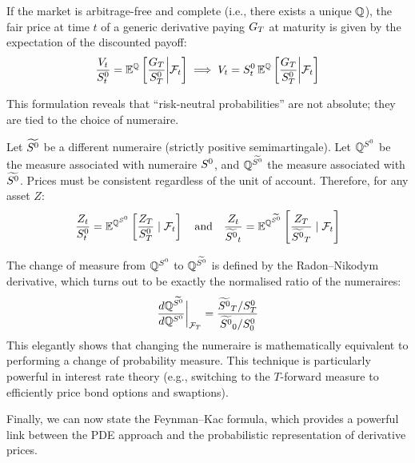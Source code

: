If the market is arbitrage-free and complete (i.e., there exists a unique $\mathbb{Q}$), the fair price at time $t$ of a generic derivative paying $G_T$ at maturity is given by the expectation of the discounted payoff:
\begin{equation}
    \frac{V_t}{S^0_t} = \mathbb{E}^{\mathbb{Q}} \left[ \frac{G_T}{S^0_T} \bigg| \mathcal{F}_t \right] \implies V_t = S^0_t \, \mathbb{E}^{\mathbb{Q}} \left[ \frac{G_T}{S^0_T} \bigg| \mathcal{F}_t \right] \label{eq:riskneutralpricing}
\end{equation}

This formulation reveals that ``risk-neutral probabilities'' are not absolute; they are tied to the choice of numeraire.

Let $\widetilde{S^{0}}$ be a different numeraire (strictly positive semimartingale). Let $\mathbb{Q}^{S^{0}}$ be the measure associated with numeraire $S^{0}$, and $\mathbb{Q}^{\widetilde{S^{0}}}$ the measure associated with $\widetilde{S^{0}}$.
Prices must be consistent regardless of the unit of account. Therefore, for any asset $Z$:
\begin{equation}
    \frac{Z_t}{S^0_t} = \mathbb{E}^{\mathbb{Q}^{S^{0}}}\left[ \frac{Z_T}{S^0_T} \mid \mathcal{F}_t \right] \quad \text{and} \quad \frac{Z_t}{\widetilde{S^{0}}_t} = \mathbb{E}^{\mathbb{Q}^{\widetilde{S^{0}}}}\left[ \frac{Z_T}{\widetilde{S^{0}}_T} \mid \mathcal{F}_t \right]
\end{equation}

The change of measure from $\mathbb{Q}^{S^{0}}$ to $\mathbb{Q}^{\widetilde{S^{0}}}$ is defined by the Radon--Nikodym derivative, which turns out to be exactly the normalised ratio of the numeraires:
\begin{equation}
    \frac{d\mathbb{Q}^{\widetilde{S^{0}}}}{d\mathbb{Q}^{S^{0}}}\bigg|_{\mathcal{F}_T} = \frac{\widetilde{S^{0}}_T / S^0_T}{\widetilde{S^{0}}_0 / S^0_0} \label{eq:numerairechange}
\end{equation}
This elegantly shows that changing the numeraire is mathematically equivalent to performing a change of probability measure. This technique is particularly powerful in interest rate theory (e.g., switching to the $T$-forward measure to efficiently price bond options and swaptions).

\vspace{0.2cm}

Finally, we can now state the Feynman--Kac formula, which provides a powerful link between the PDE approach and the probabilistic representation of derivative prices.

